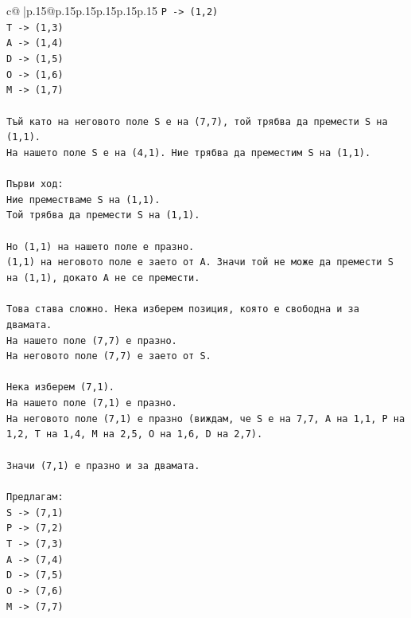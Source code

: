 \documentclass{article}
\begin{document}
{\begin{supertabular}{c@{$\;$}|p{.15\linewidth}@{}p{.15\linewidth}p{.15\linewidth}p{.15\linewidth}p{.15\linewidth}p{.15\linewidth}}
{{{\texttt{P {-}> (1,2)} \\
\texttt{T {-}> (1,3)} \\
\texttt{A {-}> (1,4)} \\
\texttt{D {-}> (1,5)} \\
\texttt{O {-}> (1,6)} \\
\texttt{M {-}> (1,7)} \\
\\ 
\texttt{Тъй като на неговото поле S е на (7,7), той трябва да премести S на (1,1).} \\
\texttt{На нашето поле S е на (4,1). Ние трябва да преместим S на (1,1).} \\
\\ 
\texttt{Първи ход:} \\
\texttt{Ние преместваме S на (1,1).} \\
\texttt{Той трябва да премести S на (1,1).} \\
\\ 
\texttt{Но (1,1) на нашето поле е празно.} \\
\texttt{(1,1) на неговото поле е заето от A. Значи той не може да премести S на (1,1), докато A не се премести.} \\
\\ 
\texttt{Това става сложно. Нека изберем позиция, която е свободна и за двамата.} \\
\texttt{На нашето поле (7,7) е празно.} \\
\texttt{На неговото поле (7,7) е заето от S.} \\
\\ 
\texttt{Нека изберем (7,1).} \\
\texttt{На нашето поле (7,1) е празно.} \\
\texttt{На неговото поле (7,1) е празно (виждам, че S е на 7,7, A на 1,1, P на 1,2, T на 1,4, M на 2,5, O на 1,6, D на 2,7).} \\
\\ 
\texttt{Значи (7,1) е празно и за двамата.} \\
\\ 
\texttt{Предлагам:} \\
\texttt{S {-}> (7,1)} \\
\texttt{P {-}> (7,2)} \\
\texttt{T {-}> (7,3)} \\
\texttt{A {-}> (7,4)} \\
\texttt{D {-}> (7,5)} \\
\texttt{O {-}> (7,6)} \\
\texttt{M {-}> (7,7)} \\
}}}
\end{supertabular}}
\end{document}
